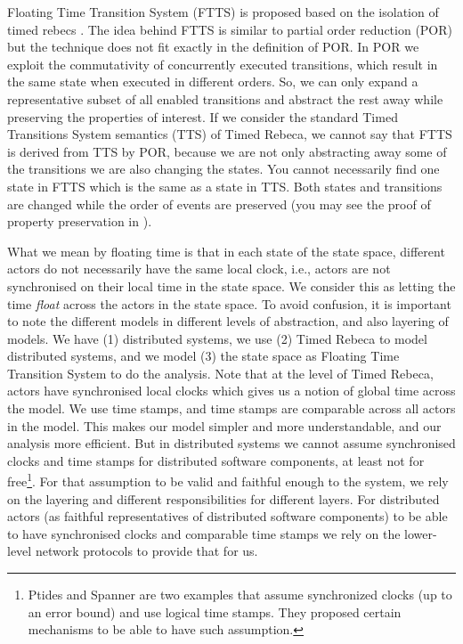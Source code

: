 Floating Time Transition System (FTTS) is proposed based on the isolation of timed rebecs \cite{DBLP:conf/facs2/KhamespanahSVK15,DBLP:journals/scp/KhamespanahSSKI15}. The idea behind FTTS is similar to partial order reduction (POR) but the technique does not fit exactly in the definition of POR. 
%
In POR we exploit the commutativity of concurrently executed transitions, which result in the same state when executed in different orders. So, we can only expand a representative subset of all enabled transitions and abstract the rest away while preserving the properties of interest. %
%
If we consider the standard Timed Transitions System semantics (TTS) of Timed Rebeca, we cannot say that FTTS is derived from TTS by POR, because we are not only abstracting away some of the transitions we are also changing the states. You cannot necessarily find one state in FTTS which is the same as a state in TTS. Both states and transitions are changed while the order of events are preserved (you may see the proof of property preservation in \cite{DBLP:conf/facs2/KhamespanahSVK15}).
%

What we mean by floating time is that in each state of the state space, different actors do not necessarily have the same local clock, i.e.,  actors are not synchronised on their local time in the state space. We consider this as letting the time \textit{float} across the actors in the state space. 
To avoid confusion, it is important to note the different models in different levels of abstraction, and also layering of models. We have (1) distributed systems, we use (2) Timed Rebeca to model distributed systems, and we model (3) the state space as Floating Time Transition System to do the analysis. 
%
Note that at the level of Timed Rebeca, actors have synchronised local clocks which gives us a notion of global time across the model. We use time stamps, and time stamps are comparable across all actors in the model. This makes our model simpler and more understandable, and our analysis more efficient.
But in distributed systems we cannot assume synchronised clocks and time stamps for distributed software components, at least not for free\footnote{Ptides\cite{DBLP:conf/dsrt/DerlerLM08} and Spanner\cite{Corbett:2013:SGG:2518037.2491245} are two examples that assume synchronized clocks  (up to an error bound) and use logical time stamps.
They proposed certain mechanisms to be able to have such assumption.}. 
For that assumption to be valid and faithful enough to the system,  we rely on the layering and different responsibilities for different layers. For distributed actors (as faithful representatives of distributed software components) to be able to have synchronised clocks and comparable time stamps we rely on the lower-level network protocols to provide that for us. 

